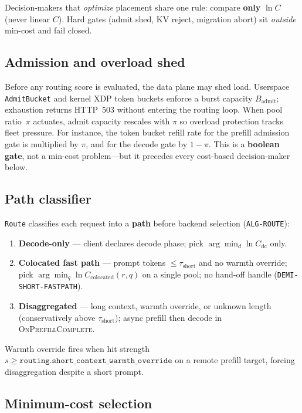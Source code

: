 \documentclass[11pt,a4paper]{article}
\begin{document}
Decision-makers that \emph{optimize} placement share one rule: compare
\textbf{only} $\ln C$ (never linear $C$). Hard gates (admit shed, KV reject,
migration abort) sit \emph{outside} min-cost and fail closed.

\subsection{Admission and overload shed}

Before any routing score is evaluated, the data plane may shed load.
Userspace \texttt{AdmitBucket} and kernel XDP token buckets enforce a burst
capacity $B_{\mathrm{admit}}$; exhaustion returns HTTP~503 without entering
the routing loop.
When pool ratio~$\pi$ actuates, admit capacity rescales with $\pi$ so overload
protection tracks fleet pressure.
For instance, the token bucket refill rate for the prefill admission gate is
multiplied by $\pi$, and for the decode gate by $1-\pi$.
This is a \textbf{boolean gate}, not a min-cost problem---but it precedes every
cost-based decision-maker below.

\subsection{Path classifier}

\texttt{Route} classifies each request into a \textbf{path} before backend
selection (\texttt{ALG-ROUTE}):

\begin{enumerate}[nosep]
  \item \textbf{Decode-only} --- client declares decode phase; pick
        $\arg\min_{d} \ln C_{\mathrm{dc}}$ only.
  \item \textbf{Colocated fast path} --- prompt tokens
        $\le \tau_{\mathrm{short}}$ and no warmth override; pick
        $\arg\min_{q} \ln C_{\mathrm{colocated}}(r,q)$ on a single pool;
        no hand-off handle (\texttt{DEMI-SHORT-FASTPATH}).
  \item \textbf{Disaggregated} --- long context, warmth override, or unknown
        length (conservatively above $\tau_{\mathrm{short}}$); async prefill
        then decode in \textsc{OnPrefillComplete}.
\end{enumerate}

Warmth override fires when hit strength
$s \ge \texttt{routing.short\_context\_warmth\_override}$ on a remote prefill
target, forcing disaggregation despite a short prompt.

\subsection{Minimum-cost selection}
\end{document}
